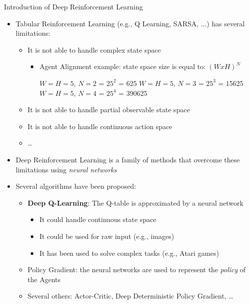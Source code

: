 \documentclass[presentation, 8pt]{beamer}\mode<presentation>{\usetheme{AMSBolognaFC}}
\begin{document}
\begin{frame}{Introduction of Deep Reinforcement Learning}
\begin{itemize}
	\item Tabular Reinforcement Learning (e.g., Q Learning, SARSA, ...) has several limitations:
	\begin{itemize}
		\item It is not able to handle complex state space 
		\begin{itemize}
			\item Agent Alignment example: state space size is equal to: $(WxH)^N$
			\begin{tasks}
				\task $W = H = 5$, $N = 2$ = $25^2$ = 625
				\task $W = H = 5$, $N = 3$ = $25^3$ = 15625
				\task $W = H = 5$, $N = 4$ = $25^4$ = 390625
			\end{tasks}
		\end{itemize}
		\item It is not able to handle partial observable state space
		\item It is not able to handle continuous action space
		\item \dots
	\end{itemize}
	\item Deep Reinforcement Learning is a family of methods that overcome these limitations using \emph{neural networks}
	\item Several algorithms have been proposed:
	\begin{itemize}
		\item \textbf{Deep Q-Learning}: The Q-table is approximated by a neural network
		\begin{itemize}
			\item It could handle continuous state space
			\item It could be used for raw input (e.g., images)
			\item It has been used to solve complex tasks (e.g., Atari games)
		\end{itemize}
		\item Policy Gradient: the neural networks are used to represent the \emph{policy} of the Agents
		\item Several others: Actor-Critic, Deep Deterministic Policy Gradient, \dots
	\end{itemize}
\end{itemize}
\end{frame}
\end{document}

